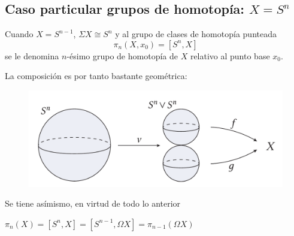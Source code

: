 \subsection{Caso particular grupos de homotopía: $X = S^n$}
Cuando $ X = S^{n-1}$, $\Sigma X \cong S^n$ y al grupo de clases de homotopía punteada
\[ \pi_n(X, x_0) = [S^n, X] \]
se le denomina $n$-ésimo grupo de homotopía de $X$ relativo al punto base $x_0$. \par
La composición es por tanto bastante geométrica:\par \vspace{1em}
\begin{figure}[h]
\centering
\includegraphics[width=\textwidth]{images/ejgruphomot.pdf}
\end{figure}
\par
Se tiene asímismo, en virtud de todo lo anterior
\begin{teor}
$\pi_n(X) = [S^n, X] = [S^{n-1}, \Omega X] = \pi_{n-1}(\Omega X)$
\end{teor}

